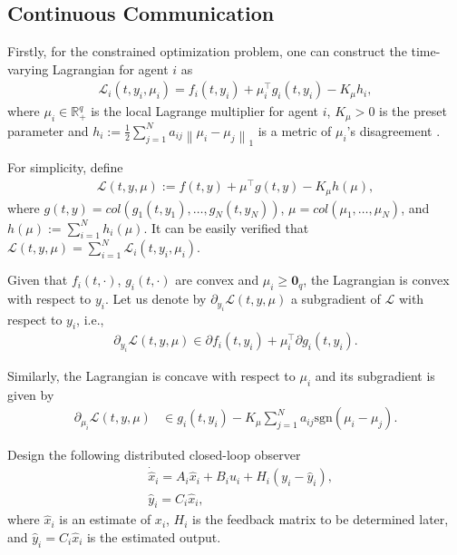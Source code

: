 \documentclass[final,5p,times,twocolumn,authoryear]{elsarticle}
\newcommand{\sign}[1]{\mathrm{sgn}(#1)}
\begin{document}
	\subsection{Continuous Communication}
	
	Firstly,  for the constrained optimization problem, one can construct the time-varying Lagrangian for agent $i$ as
	\begin{align}
		\mathcal{L}_i(t,y_i,\mu_i)=f_i(t,y_i)+\mu_i^\top g_i(t,y_i) - K_\mu h_i,\label{la}
	\end{align}
	where $\mu_i\in\mathbb{R}_+^{q}$ is the local Lagrange multiplier for agent $i$, $K_\mu>0$ is the preset parameter and $h_i:= \frac{1}{2}\sum_{j=1}^N a_{ij}\left\|\mu_i-\mu_j\right\|_1$ is a metric of $\mu_i$'s disagreement {\citep{liang2018}}.  
	
	For simplicity, define
	\begin{align}
		\mathcal{L}(t,y,\mu):= f(t,y)+\mu^\top g(t,y) - K_\mu h(\mu),\label{lag}
	\end{align}
	where $g(t,y)=col(g_1(t,y_1), \dots, g_N(t,y_N))$, $\mu=col(\mu_1, \dots, \mu_N)$, and $h(\mu):=\sum_{i=1}^N h_i(\mu)$. It can be easily verified that  $\mathcal{L}(t,y,\mu)=\sum_{i=1}^{N}\mathcal{L}_i(t,y_i,\mu_i)$.
	
	Given that $f_i(t,\cdot)$, $g_i(t,\cdot)$ are convex and $\mu_i \ge \boldsymbol 0_q$,
	the Lagrangian is convex with respect to $y_i$. Let us
	denote by $\partial_{y_i}\mathcal{L}(t,y,\mu)$ a subgradient of $\mathcal{L}$ with respect to $y_i$, i.e.,
	\begin{align}
		\partial_{y_i}\mathcal{L}(t,y,\mu)\in \partial f_i(t,y_i)+\mu_i^\top \partial g_i(t,y_i).\label{lax}
	\end{align}


	Similarly, the Lagrangian is concave with respect to $\mu_i$ and its subgradient is given by
	\begin{align}
		\partial_{\mu_i}\mathcal{L}(t,y,\mu)&\in g_i(t,y_i) - K_\mu\sum_{j=1}^N a_{ij}\sign{\mu_i-\mu_j}.\label{lamu}
	\end{align}
	
	
	
	Design the following distributed closed-loop observer
	\begin{subequations}\label{ob1}
		\begin{align}
			&\dot{\hat{x}}_i=A_i \hat{x}_i + B_iu_i + H_i(y_i -\hat{y}_i), \label{ob1a}\\
			&\hat{y}_i=C_i\hat{x}_i,\label{ob1b}
		\end{align}
	\end{subequations}
	where $\hat{x}_i$ is an estimate of $x_i$, $H_i$ is the feedback matrix to be determined later, and $\hat{y}_i=C_i\hat{x}_i$ is the estimated output.
	
\end{document}
